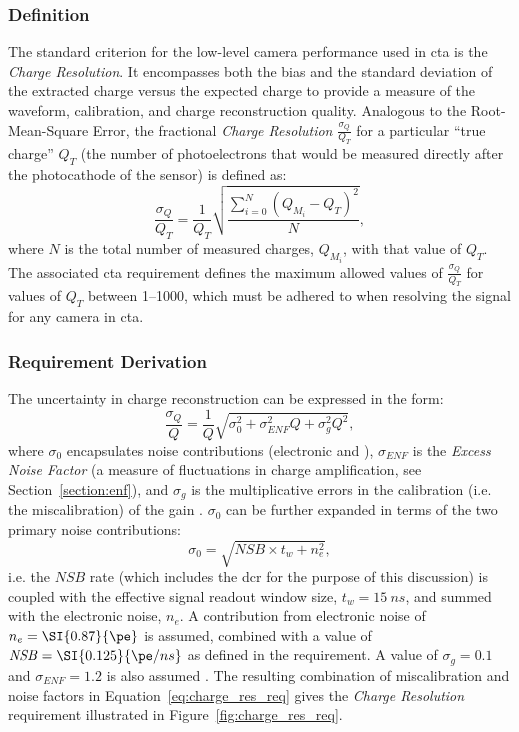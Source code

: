 \subsubsection{Definition}

The standard criterion for the low-level camera performance used in \gls{cta} is the \textit{Charge Resolution}. It encompasses both the bias and the standard deviation of the extracted charge versus the expected charge to provide a measure of the waveform, calibration, and charge reconstruction quality. Analogous to the Root-Mean-Square Error, the fractional \textit{Charge Resolution} $\frac{\sigma_Q}{Q_T}$ for a particular ``true charge'' $Q_T$ (the number of photoelectrons that would be measured directly after the photocathode of the sensor) is defined as:
\begin{equation} \label{eq:charge_res}
\frac{\sigma_Q}{Q_T} = \frac{1}{Q_T} \sqrt{\frac{\sum_{i=0}^N (Q_{M_i} - Q_T)^2}{N}},
\end{equation}
where $N$ is the total number of measured charges, $Q_{M_i}$, with that value of $Q_T$. The associated \gls{cta} requirement defines the maximum allowed values of $\frac{\sigma_Q}{Q_T}$ for values of $Q_T$ between \SIrange{1}{1000}{\pe}, which must be adhered to when resolving the signal for any camera in \gls{cta}.

\subsubsection{Requirement Derivation}

The uncertainty in charge reconstruction can be expressed in the form:
\begin{equation} \label{eq:charge_res_req}
\frac{\sigma_Q}{Q} = \frac{1}{Q} \sqrt{\sigma_0^2 + \sigma_{ENF}^2 Q + \sigma_g^2 Q^2},
\end{equation}
where $\sigma_0$ encapsulates noise contributions (electronic and ), $\sigma_{ENF}$ is the \textit{Excess Noise Factor} (a measure of fluctuations in charge amplification, see Section~\ref{section:enf}), and $\sigma_g$ is the multiplicative errors in the calibration (i.e. the miscalibration) of the gain \cite{petophotons}\cite{Ohm2012}. $\sigma_0$ can be further expanded in terms of the two primary noise contributions:
\begin{equation} \label{eq:charge_res_nsb}
\sigma_0 = \sqrt{\mathit{NSB} \times t_w + n_e^2},
\end{equation}
i.e. the $\mathit{NSB}$ rate (which includes the \gls{dcr} for the purpose of this discussion) is coupled with the effective signal readout window size, $t_w = \SI{15}{ns}$, and summed with the electronic noise, $n_e$. A contribution from electronic noise of $n_e = \SI{0.87}{\pe}$ is assumed, combined with a value of $\mathit{NSB} = \SI{0.125}{\pe/ns}$ as defined in the requirement. A value of $\sigma_g = 0.1$ and $\sigma_{ENF} = 1.2$ is also assumed \cite{petophotons}. The resulting combination of miscalibration and noise factors in Equation~\ref{eq:charge_res_req} gives the \textit{Charge Resolution} requirement illustrated in Figure~\ref{fig:charge_res_req}.

